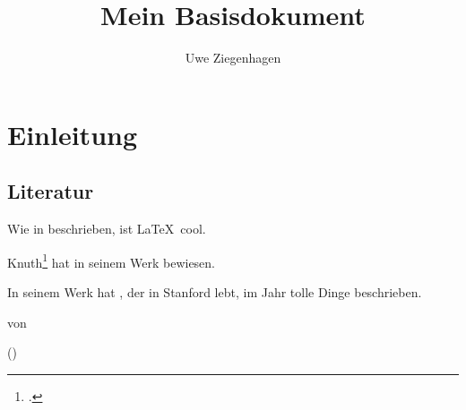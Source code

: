 \documentclass[12pt,ngerman,parskip=half,bibtotoc]{scrreprt}
\author{Uwe Ziegenhagen}
\title{Mein Basisdokument}
\newcommand{\pcite}[1]{\citeauthor{#1} (\citeyear{#1})}
\begin{document}
\maketitle

\tableofcontents
\listoffigures

\chapter{Einleitung}

\section{Literatur}

Wie in \cite{knuth:1984} beschrieben, ist \LaTeX\ cool.

\parencite{knuth:1984}

Knuth\footcite{knuth:1984} hat in seinem Werk bewiesen.


In seinem Werk  hat \citeauthor{knuth:1984}, der in Stanford lebt, im Jahr \citeyear{knuth:1984} tolle Dinge beschrieben.

 von \citeauthor{Ziegenhagen2022}

\cite{ziegenhagen:2017}

\pcite{ziegenhagen:2017}

\cite{eckstein2022causality}

\blindtext[2]

\blindtext[2]

\printbibliography
\end{document}
